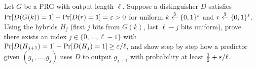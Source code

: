 \begin{exercise}
\label{ch10:ex-hybrid}
Let $G$ be a PRG with output length $\ell$. Suppose a distinguisher $D$ satisfies $\Pr[D(G(k))=1] - \Pr[D(r)=1] = \varepsilon > 0$ for uniform $k \stackrel{\$}{\gets} \{0,1\}^s$ and $r \stackrel{\$}{\gets} \{0,1\}^\ell$. Using the hybrids $H_j$ (first $j$ bits from $G(k)$, last $\ell - j$ bits uniform), prove there exists an index $j \in \{0,\dots,\ell-1\}$ with $\Pr[D(H_{j+1})=1] - \Pr[D(H_j)=1] \ge \varepsilon/\ell$, and show step by step how a predictor given $(g_1,\dots,g_j)$ uses $D$ to output $g_{j+1}$ with probability at least $\tfrac12 + \varepsilon/\ell$.
\end{exercise}
